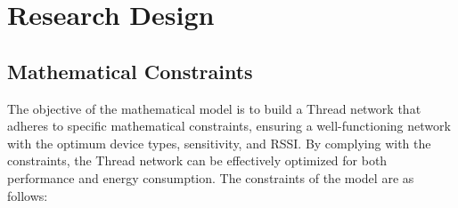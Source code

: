\chapter{Research Design}\label{chap:research_design}

\section{Mathematical Constraints}

The objective of the mathematical model is to build a Thread network that adheres to specific mathematical constraints, ensuring a well-functioning network with the optimum device types, sensitivity, and \gls{RSSI}. By complying with the constraints, the Thread network can be effectively optimized for both performance and energy consumption. The constraints of the model are as follows:

